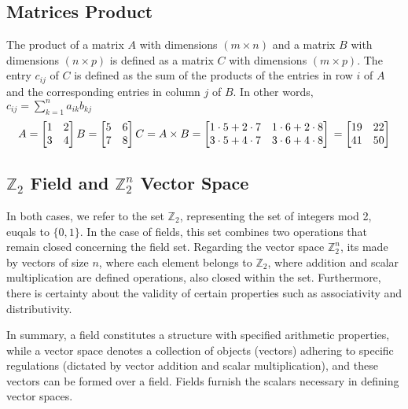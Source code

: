 \subsection{Matrices Product}
The product of a matrix $A$ with dimensions $(m \times n)$ and a matrix $B$ with dimensions $(n \times p)$ is defined as a matrix $C$ with dimensions $(m \times p)$. The entry $c_{ij}$ of $C$ is defined as the sum of the products of the entries in row $i$ of $A$ and the corresponding entries in column $j$ of $B$. In other words, $c_{ij} = \sum_{k=1}^n a_{ik} b_{kj}$
$$
A = \begin{bmatrix}
1 & 2 \\
3 & 4
\end{bmatrix} \\
B = \begin{bmatrix}
5 & 6 \\
7 & 8
\end{bmatrix} \\
C = A \times B \\
= \begin{bmatrix}
1 \cdot 5 + 2 \cdot 7 & 1 \cdot 6 + 2 \cdot 8 \\
3 \cdot 5 + 4 \cdot 7 & 3 \cdot 6 + 4 \cdot 8
\end{bmatrix} \\
= \begin{bmatrix}
19 & 22 \\
41 & 50
\end{bmatrix}
$$

\subsection{$\mathbb{Z}_2$ Field and $\mathbb{Z}_2^n$ Vector Space}
In both cases, we refer to the set $\mathbb{Z}_2$, representing the set of integers mod 2, euqals to $\{0, 1\}$. In the case of fields, this set combines two operations that remain closed concerning the field set. Regarding the vector space $\mathbb{Z}_2^n$, its made by vectors of size $n$, where each element belongs to $\mathbb{Z}_2$, where addition and scalar multiplication are defined operations, also closed within the set. Furthermore, there is certainty about the validity of certain properties such as associativity and distributivity.

In summary, a field constitutes a structure with specified arithmetic properties, while a vector space denotes a collection of objects (vectors) adhering to specific regulations (dictated by vector addition and scalar multiplication), and these vectors can be formed over a field. Fields furnish the scalars necessary in defining vector spaces.

